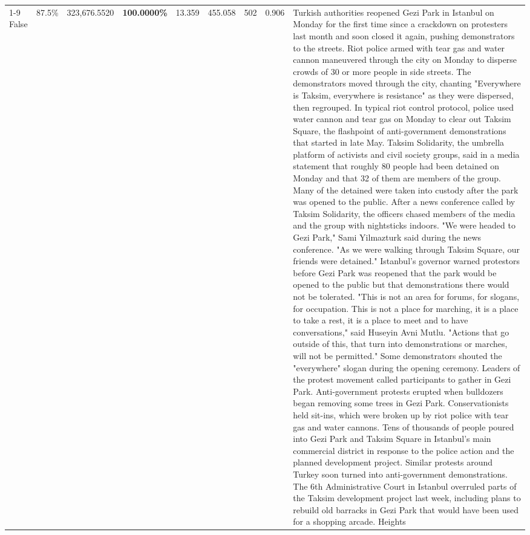 \begin{table}[H]
\begin{tabular}{lllrlllll}
\cline{1-9}
False & 87.5\% & 323,676.5520 & \bfseries \color{red} 100.0000\% & 13.359 & 455.058 & 502 & 0.906 & Turkish authorities reopened Gezi Park in Istanbul on Monday for the first time since a crackdown on protesters last month and soon closed it again, pushing demonstrators to the streets. Riot police armed with tear gas and water cannon maneuvered through the city on Monday to disperse crowds of 30 or more people in side streets. The demonstrators moved through the city, chanting "Everywhere is Taksim, everywhere is resistance" as they were dispersed, then regrouped. In typical riot control protocol, police used water cannon and tear gas on Monday to clear out Taksim Square, the flashpoint of anti-government demonstrations that started in late May. Taksim Solidarity, the umbrella platform of activists and civil society groups, said in a media statement that roughly 80 people had been detained on Monday and that 32 of them are members of the group. Many of the detained were taken into custody after the park was opened to the public. After a news conference called by Taksim Solidarity, the officers chased members of the media and the group with nightsticks indoors. "We were headed to Gezi Park," Sami Yilmazturk said during the news conference. "As we were walking through Taksim Square, our friends were detained." Istanbul's governor warned protestors before Gezi Park was reopened that the park would be opened to the public but that demonstrations there would not be tolerated. "This is not an area for forums, for slogans, for occupation. This is not a place for marching, it is a place to take a rest, it is a place to meet and to have conversations," said Huseyin Avni Mutlu. "Actions that go outside of this, that turn into demonstrations or marches, will not be permitted." Some demonstrators shouted the "everywhere" slogan during the opening ceremony. Leaders of the protest movement called participants to gather in Gezi Park. Anti-government protests erupted when bulldozers began removing some trees in Gezi Park. Conservationists held sit-ins, which were broken up by riot police with tear gas and water cannons. Tens of thousands of people poured into Gezi Park and Taksim Square in Istanbul's main commercial district in response to the police action and the planned development project. Similar protests around Turkey soon turned into anti-government demonstrations. The 6th Administrative Court in Istanbul overruled parts of the Taksim development project last week, including plans to rebuild old barracks in Gezi Park that would have been used for a shopping arcade. Heights \\

\end{tabular}
\end{table}
